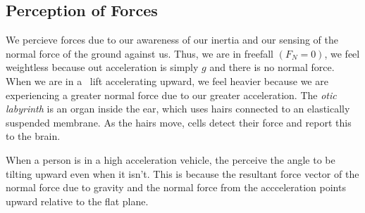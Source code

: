 \documentclass[12pt]{report}
\begin{document}
\begin{flushleft}
\subsection*{Perception of Forces}
We percieve forces due to our awareness of our inertia and our sensing of the normal
force of the ground against us. Thus, we are in freefall \((F_N = 0)\), we feel weightless
because out acceleration is simply \(g\) and there is no normal force. When we are in a \
lift accelerating upward, we feel heavier because we are experiencing a greater normal force
due to our greater acceleration. The \textit{otic labyrinth} is an organ inside the ear, which
uses hairs connected to an elastically suspended membrane. As the hairs move, cells detect their
force and report this to the brain.

\bigskip
When a person is in a high acceleration vehicle, the perceive the angle to be tilting upward 
even when it isn't. This is because the resultant force vector of the normal force due to gravity
and the normal force from the accceleration points upward relative to the flat plane.

\end{flushleft}
\end{document}
